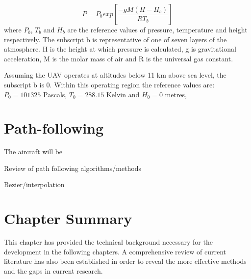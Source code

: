 \begin{equation}\label{eqn:baroFormula}
P=P_{b}exp\left[\frac{-g M (H-H_{b})}{R T_{b}}\right]
\end{equation}
where $P_{b}$, $T_{b}$ and $H_{b}$ are the reference values of pressure, temperature and height respectively. The subscript b is representative of one of seven layers of the atmosphere. H is the height at which pressure is calculated, g is gravitational acceleration, M is the molar mass of air and R is the universal gas constant. 

Assuming the UAV operates at altitudes below 11 km above sea level, the subscript b is 0. Within this operating region the reference values are: $P_{0}=101 325$ Pascals, $T_{0}=288.15$ Kelvin and $H_{0}=0$ metres,
 
\section{Path-following}
The aircraft will be 


Review of path following algorithms/methods

Bezier/interpolation

\section{Chapter Summary}
This chapter has provided the technical background necessary for the development in the following chapters. A comprehensive review of current literature has also been established in order to reveal the more effective methods and the gaps in current research.



\clearpage


